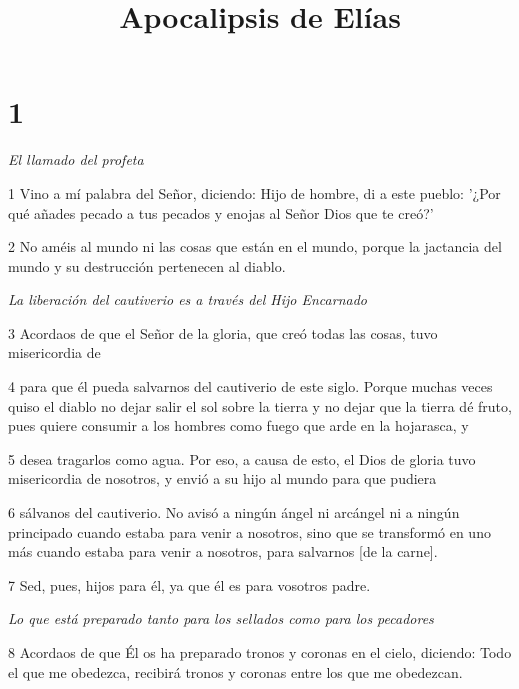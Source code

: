 

\title{Apocalipsis de Elías}

\chapter{1}

\par \textit{El llamado del profeta}

\par 1 Vino a mí palabra del Señor, diciendo: Hijo de hombre, di a este pueblo: '¿Por qué añades pecado a tus pecados y enojas al Señor Dios que te creó?'

\par 2 No améis al mundo ni las cosas que están en el mundo, porque la jactancia del mundo y su destrucción pertenecen al diablo.

\par \textit{La liberación del cautiverio es a través del Hijo Encarnado}

\par 3 Acordaos de que el Señor de la gloria, que creó todas las cosas, tuvo misericordia de

\par 4 para que él pueda salvarnos del cautiverio de este siglo. Porque muchas veces quiso el diablo no dejar salir el sol sobre la tierra y no dejar que la tierra dé fruto, pues quiere consumir a los hombres como fuego que arde en la hojarasca, y

\par 5 desea tragarlos como agua. Por eso, a causa de esto, el Dios de gloria tuvo misericordia de nosotros, y envió a su hijo al mundo para que pudiera

\par 6 sálvanos del cautiverio. No avisó a ningún ángel ni arcángel ni a ningún principado cuando estaba para venir a nosotros, sino que se transformó en uno más cuando estaba para venir a nosotros, para salvarnos [de la carne].

\par 7 Sed, pues, hijos para él, ya que él es para vosotros padre.

\par \textit{Lo que está preparado tanto para los sellados como para los pecadores}

\par 8 Acordaos de que Él os ha preparado tronos y coronas en el cielo, diciendo: Todo el que me obedezca, recibirá tronos y coronas entre los que me obedezcan.

